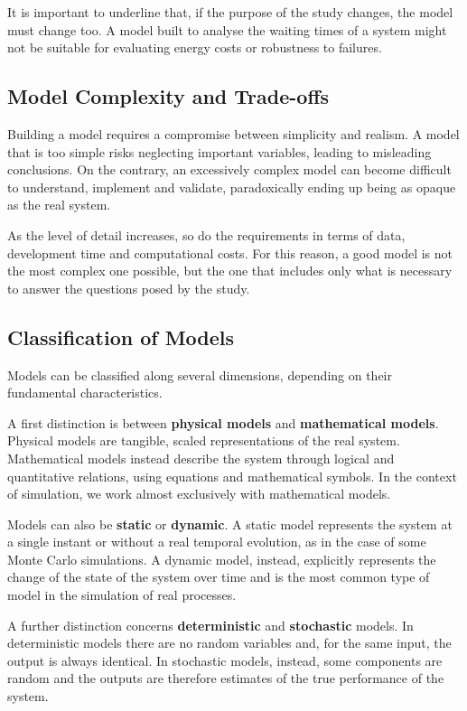 It is important to underline that, if the purpose of the study changes, the model must change too. A model built to analyse the waiting times of a system might not be suitable for evaluating energy costs or robustness to failures.

\subsection{Model Complexity and Trade-offs}

Building a model requires a compromise between simplicity and realism. A model that is too simple risks neglecting important variables, leading to misleading conclusions. On the contrary, an excessively complex model can become difficult to understand, implement and validate, paradoxically ending up being as opaque as the real system.

As the level of detail increases, so do the requirements in terms of data, development time and computational costs. For this reason, a good model is not the most complex one possible, but the one that includes only what is necessary to answer the questions posed by the study.

\subsection{Classification of Models}

Models can be classified along several dimensions, depending on their fundamental characteristics.

A first distinction is between \textbf{physical models} and \textbf{mathematical models}. Physical models are tangible, scaled representations of the real system. Mathematical models instead describe the system through logical and quantitative relations, using equations and mathematical symbols. In the context of simulation, we work almost exclusively with mathematical models.

Models can also be \textbf{static} or \textbf{dynamic}. A static model represents the system at a single instant or without a real temporal evolution, as in the case of some Monte Carlo simulations. A dynamic model, instead, explicitly represents the change of the state of the system over time and is the most common type of model in the simulation of real processes.

A further distinction concerns \textbf{deterministic} and \textbf{stochastic} models. In deterministic models there are no random variables and, for the same input, the output is always identical. In stochastic models, instead, some components are random and the outputs are therefore estimates of the true performance of the system.

